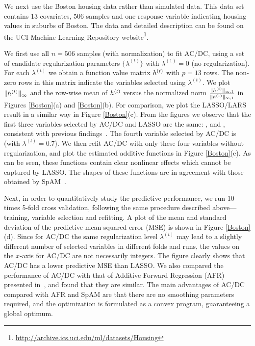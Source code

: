 
We next use the Boston housing data rather than simulated data. This data set
contains 13 covariates, 506 samples and one response variable
indicating housing values in suburbs of Boston. The data and detailed description
can be found on the UCI Machine Learning Repository website\footnote{\url{http://archive.ics.uci.edu/ml/datasets/Housing}}. 

We first use all $n=506$ samples (with normalization) to fit AC/DC,
using a set of candidate regularization parameters $\{\lambda^{(t)}\}$
with $\lambda^{(1)}=0$ (no regularization). For each $\lambda^{(t)}$
we obtain a function value matrix $h^{(t)}$ with $p=13$
rows. The non-zero rows in this matrix indicate the variables selected
using $\lambda^{(t)}$.  We plot $\|h^{(t)}\|_{\infty}$ and
the row-wise mean of $h^{(t)}$ versus the normalized norm
$\frac{\|h^{(t)}\|_{\infty,1}}{\|h^{(1)}\|_{\infty,1}}$
in Figures \ref{Boston}(a) and \ref{Boston}(b).  For comparison, we
plot the LASSO/LARS result in a similar way in Figure \ref{Boston}(c).
From the figures we observe that the first three variables selected by
AC/DC and LASSO are the same: ,  and ,
consistent with previous findings~\citep{SpAM:07}.  The fourth
variable selected by AC/DC is  (with $\lambda^{(t)}=0.7$).
We then refit AC/DC with only these four variables without
regularization, and plot the estimated additive functions in Figure
\ref{Boston}(e). As can be seen, these functions contain clear
nonlinear effects which cannot be captured by LASSO. The shapes of
these functions are in agreement with those obtained by
SpAM~\citep{SpAM:07}.

Next, in order to quantitatively study the predictive performance, we
run 10 times 5-fold cross validation, following the same procedure
described above---training, variable selection and refitting.  A plot
of the mean and standard deviation of the predictive mean squared
error (MSE) is shown in Figure \ref{Boston}(d). Since for AC/DC the same
regularization level $\lambda^{(t)}$ may lead to a slightly different number of selected
variables in different folds and runs, the values on the $x$-axis
for AC/DC are not necessarily integers. The figure clearly shows that AC/DC has a 
lower predictive MSE than LASSO.  We also compared the performance of
AC/DC with that of Additive Forward Regression (AFR) presented
in~\cite{Xi:09}, and found that they are similar.  The main advantages
of AC/DC compared with AFR and SpAM are that there are no smoothing
parameters required, and the optimization is formulated
as a convex program, guaranteeing a global optimum.


